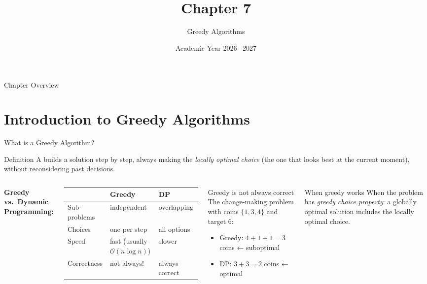 \documentclass[aspectratio=169]{beamer}
\title[Ch.\,7 -- Greedy Algorithms]{Chapter 7}
\subtitle{Greedy Algorithms}
\date{Academic Year 2026\,--\,2027}
\begin{document}
\begin{frame}[plain]\titlepage\end{frame}
\begin{frame}{Chapter Overview}
  \begin{center}
    \begin{minipage}{0.85\textwidth}
      \tableofcontents[hideallsubsections,sectionstyle=show/shaded]
    \end{minipage}
  \end{center}
\end{frame}

\section{Introduction to Greedy Algorithms}

\begin{frame}[shrink=12]{What is a Greedy Algorithm?}
  \begin{block}{Definition}
    A  builds a solution step by step,
    always making the \emph{locally optimal choice} (the one that looks
    best at the current moment), without reconsidering past decisions.
  \end{block}
  \vspace{0.4em}
  \begin{columns}[T]
      \textbf{Greedy vs.\ Dynamic Programming:}
      \begin{tabular}{lll}
        \toprule
        & \textbf{Greedy} & \textbf{DP} \\
        \midrule
        Sub-problems & independent & overlapping \\
        Choices & one per step & all options \\
        Speed & fast (usually $\mathcal{O}(n\log n)$) & slower \\
        Correctness & not always! & always correct \\
        \bottomrule
      \end{tabular}
      \begin{alertblock}{Greedy is not always correct}
        The change-making problem with coins $\{1,3,4\}$ and target 6:
        \begin{itemize}
          \item Greedy: $4+1+1 = 3$ coins ← \alert{suboptimal}
          \item DP: $3+3 = 2$ coins ← optimal
        \end{itemize}
      \end{alertblock}
      \begin{exampleblock}{When greedy works}
        When the problem has \emph{greedy choice property}:
        a globally optimal solution includes the locally optimal choice.
      \end{exampleblock}
  \end{columns}
\end{frame}
\end{document}
